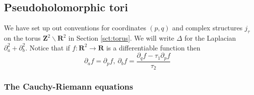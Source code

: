 \documentclass[11pt]{amsart}
\newcommand{\RR}{\mathbf{R}}
\newcommand{\ZZ}{\mathbf{Z}}
\newcommand{\torus}{\ZZ^2\backslash\RR^2}
\numberwithin{equation}{section}
\theoremstyle{definition}
\theoremstyle{remark}
\begin{document}

\subsection{Pseudoholomorphic tori}

We have set up out conventions for coordinates $(p,q)$ and complex structures $j_{\tau}$ on the torus $\torus$ in Section \ref{sct:torus}. We will write $\Delta$ for the Laplacian $\partial_a^2+\partial_b^2$. Notice that if $f\colon\RR^2\to\RR$ is a differentiable function then
\begin{equation}\label{pqabderiv}\partial_af=\partial_pf,\ \partial_bf=\frac{\partial_qf-\tau_1\partial_pf}{\tau_2}\end{equation}


\subsubsection*{The Cauchy-Riemann equations}
\end{document}
